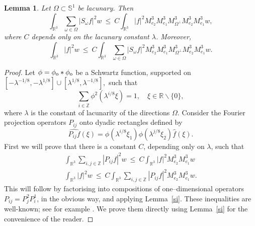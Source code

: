\documentclass[11pt]{amsart}
\newtheorem{lemma}[theorem]{Lemma}
\theoremstyle{definition}
\theoremstyle{remark}
\begin{document}
\begin{lemma}\label{onethree} Let $\Omega\subset \mathbb{S}^1$ be lacunary. Then
$$
\int_{\mathbb{R}^3} \sum_{\omega\in\Omega}|S_\omega f|^2 w\ {\leqslant} \  C\! \int_{\mathbb{R}^3}  |f|^2 M^3_{e_2}M^3_{e_1}M^3_{\Omega^\perp}M^3_{e_2}M^3_{e_1} w,
$$
where $C$ depends only on the lacunary constant ${\lambda}$.
Moreover,
$$
\int_{\mathbb{R}^3} |f|^2 w\ {\leqslant} \  C\!\int_{\mathbb{R}^3}   \sum_{\omega\in\Omega}|S_\omega f|^2 M^3_{e_2}M^3_{e_1}M^3_{\Omega^\perp}M^3_{e_2}M^3_{e_1} w.
$$
\end{lemma}

\begin{proof} Let $\phi=\phi_{\rm o}\ast \phi_{\rm o}$ be a Schwartz function, supported on $[-{\lambda}^{-1/8}, -{\lambda}^{{1/8}}]\cup[{\lambda}^{{1/8}},{\lambda}^{-1/8}],$ such that
\begin{equation}\label{part}
\sum_{i\in \mathbb{Z}} \phi^2({\lambda}^{i/8}\xi)=1,\quad \xi\in\mathbb{R}\backslash\{0\},
\end{equation}
where ${\lambda}$ is the constant of lacunarity of the directions $\Omega$.
Consider the Fourier projection operators $P_{ij}$ onto dyadic rectangles defined by
$$\widehat{P_{ij} f}(\xi)=\phi({\lambda}^{i/8}\xi_1)\phi({\lambda}^{j/8}\xi_2)\widehat{f}(\xi).$$
First we will prove that there is a constant $C$, depending only on ${\lambda}$, such that
\begin{align}\label{fr}
\int_{\mathbb{R}^3} \sum_{i,j\in\mathbb{Z}} |P_{ij}f|^2 w\ {\leqslant} \  C\! \int_{\mathbb{R}^3}  |f|^2 M^3_{e_2}M^3_{e_1} w\\
\int_{\mathbb{R}^3}|f|^2 w\ {\leqslant} \  C\! \int_{\mathbb{R}^3}   \sum_{i,j\in\mathbb{Z}} |P_{ij}f|^2M^3_{e_2}M^3_{e_1} w.\nonumber
\end{align}
This will follow by factorising into compositions of
one--dimensional operators $P_{ij}=P^2_jP^1_i$, in the obvious way,
and applying Lemma~\ref{si}. These inequalities are well-known; see for example \cite{B2}. We prove them directly using Lemma~\ref{si} for the convenience of the reader.


\end{proof}
\end{document}
